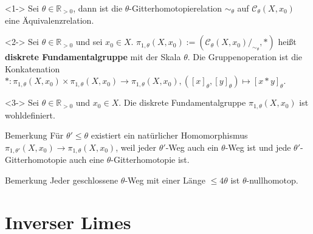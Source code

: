 \documentclass[12pt, aspectratio=169]{beamer}
\newcommand{\R}[0]{\mathbb{R}}
\begin{document}
\begin{frame}
    \begin{lemma}<1-> \label{lem:discrete-homotopy}
        Sei $\theta \in \R_{>0}$, dann ist die $\theta$-Gitterhomotopierelation $\sim_{\theta}$ auf $\mathcal{C}_{\theta}(X, x_0)$ eine Äquivalenzrelation.
    \end{lemma}

    \begin{definition}<2->
        Sei $\theta \in \R_{>0}$ und sei $x_0 \in X$. $\pi_{1,\theta}(X, x_0) := (\mathcal{C}_{\theta}(X, x_0)/_{\sim_{\theta}}, *)$ heißt \textbf{diskrete Fundamentalgruppe} mit der Skala $\theta$.
        Die Gruppenoperation ist die Konkatenation $*\colon \pi_{1,\theta}(X, x_0) \times \pi_{1,\theta}(X, x_0) \to \pi_{1,\theta}(X, x_0), ([x]_{\theta}, [y]_{\theta}) \mapsto [x * y]_{\theta}$.
    \end{definition}
    
    \begin{Satz}<3->
        Sei $\theta \in \R_{>0}$ und $x_0 \in X$. Die diskrete Fundamentalgruppe $\pi_{1,\theta}(X, x_0)$ ist wohldefiniert.
    \end{Satz}
\end{frame}

\begin{frame}
    \begin{block}{Bemerkung}
        Für $\theta' \leq \theta$ existiert ein natürlicher Homomorphismus $\pi_{1,\theta'}(X, x_0) \to \pi_{1,\theta}(X, x_0)$,
        weil jeder $\theta'$-Weg auch ein $\theta$-Weg ist und jede $\theta'$-Gitterhomotopie auch eine $\theta$-Gitterhomotopie ist.
    \end{block}
      
    \begin{block}{Bemerkung}
        Jeder geschlossene $\theta$-Weg mit einer Länge $\leq 4\theta$ ist $\theta$-nullhomotop.
    \end{block}
\end{frame}

\section{Inverser Limes}
\end{document}
